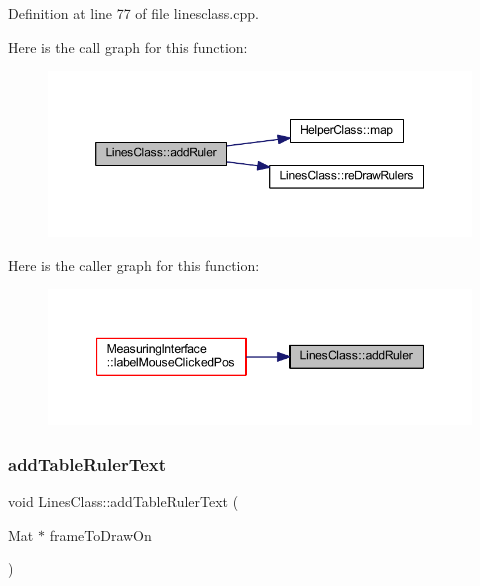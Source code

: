 Definition at line 77 of file linesclass.\+cpp.

Here is the call graph for this function\+:
\nopagebreak
\begin{figure}[H]
\begin{center}
\leavevmode
\includegraphics[width=350pt]{classLinesClass_ab61cc7912d5903aec574d53847e7ebf2_cgraph}
\end{center}
\end{figure}
Here is the caller graph for this function\+:
\nopagebreak
\begin{figure}[H]
\begin{center}
\leavevmode
\includegraphics[width=347pt]{classLinesClass_ab61cc7912d5903aec574d53847e7ebf2_icgraph}
\end{center}
\end{figure}
\mbox{\label{classLinesClass_a40228921775f778a33a391bad2830d1c}} 
\subsubsection{\texorpdfstring{addTableRulerText}{addTableRulerText}}
{\footnotesize\ttfamily void Lines\+Class\+::add\+Table\+Ruler\+Text (\begin{DoxyParamCaption}\item[{Mat $\ast$}]{frame\+To\+Draw\+On }\end{DoxyParamCaption})\hspace{0.3cm}{\ttfamily [slot]}}



